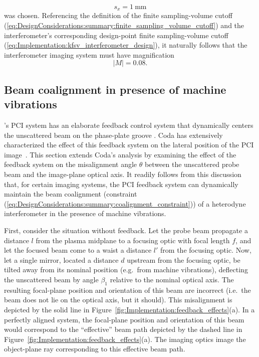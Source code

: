 \begin{equation}
  s_x = \SI{1}{\milli\meter}
  \label{eq:Implementation:detector_size}
\end{equation}
was chosen.
Referencing the definition of the finite sampling-volume cutoff
(\ref{eq:DesignConsiderations:summary:finite_sampling_volume_cutoff}) and
the interferometer's corresponding design-point
finite sampling-volume cutoff
(\ref{eq:Implementation:kfsv_interferometer_design}),
it naturally follows that the interferometer imaging system
must have magnification
\begin{equation}
  |M| = 0.08.
  \label{eq:Implementation:magnification_interferometer_design}
\end{equation}


\subsection{Beam coalignment in presence of machine vibrations}
\label{sec:Implementation:OpticalLayout:coalignment_with_feedback}
\diiid's PCI system has an elaborate feedback control system
that dynamically centers the unscattered beam on the phase-plate groove
\cite[Sec.~3.5]{coda_phd}.
Coda has extensively characterized the effect of this feedback system
on the lateral position of the PCI image~\cite[Sec.~3.5(f)]{coda_phd}.
This section extends Coda's analysis by examining
the effect of the feedback system on the misalignment angle $\theta$
between the unscattered probe beam and the image-plane optical axis.
It readily follows from this discussion that,
for certain imaging systems,
the PCI feedback system can dynamically maintain
the beam coalignment
(constraint (\ref{eq:DesignConsiderations:summary:coalignment_constraint}))
of a heterodyne interferometer in the presence of machine vibrations.

First, consider the situation without feedback.
Let the probe beam propagate a distance $l$
from the plasma midplane to a focusing optic with focal length $f$, and
let the focused beam come to a waist a distance $l'$ from the focusing optic.
Now, let a single mirror,
located a distance $d$ upstream from the focusing optic,
be tilted away from its nominal position (e.g.\ from machine vibrations),
deflecting the unscattered beam by angle $\beta_1$
relative to the nominal optical axis.
The resulting focal-plane position and orientation of this beam are incorrect
(i.e.\ the beam does not lie on the optical axis, but it should).
This misalignment is depicted by the solid line in
Figure~\ref{fig:Implementation:feedback_effects}(a).
In a perfectly aligned system,
the focal-plane position and orientation of this beam
would correspond to the ``effective'' beam path
depicted by the dashed line in
Figure~\ref{fig:Implementation:feedback_effects}(a).
The imaging optics image the object-plane ray
corresponding to this effective beam path.

